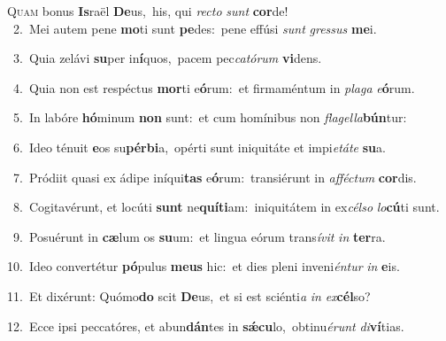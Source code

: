 \lettrine{\initial\textcolor{\initialcolor}{Q}}{uam} bonus \textbf{Is}\-raël \textbf{De}\-us,~\star his, qui \textit{rec}\-\textit{to} \textit{sunt} \textbf{cor}\-de!\\
{\numbfont\textcolor{\numbcolor}{~2.}}~Mei autem pene \textbf{mo}\-ti sunt \textbf{pe}\-des:~\star pene effúsi \textit{sunt} \textit{gres}\-\textit{sus} \textbf{me}\-i.\par
{\numbfont\textcolor{\numbcolor}{~3.}}~Quia zelávi \textbf{su}\-per in\-\textbf{í}\-quos,~\star pacem pec\-\textit{ca}\-\textit{tó}\textit{rum} \textbf{vi}\-dens.\par
{\numbfont\textcolor{\numbcolor}{~4.}}~Quia non est respéctus \textbf{mor}\-ti e\-\textbf{ó}\-rum:~\star et firmaméntum in \textit{pla}\-\textit{ga} \textit{e}\-\textbf{ó}rum.\par
{\numbfont\textcolor{\numbcolor}{~5.}}~In labóre \textbf{hó}\-minum \textbf{non} sunt:~\star et cum homínibus non \textit{fla}\-\textit{gel}\textit{la}\textbf{bún}tur:\par
{\numbfont\textcolor{\numbcolor}{~6.}}~Ideo ténuit \textbf{e}\-os su\-\textbf{pér}\-\textbf{bi}a,~\star opérti sunt iniquitáte et impi\-\textit{e}\-\textit{tá}\textit{te} \textbf{su}\-a.\par
{\numbfont\textcolor{\numbcolor}{~7.}}~Pródiit quasi ex ádipe iníqui\textbf{tas} e\-\textbf{ó}\-rum:~\star transiérunt in \textit{af}\-\textit{féc}\textit{tum} \textbf{cor}\-dis.\par
{\numbfont\textcolor{\numbcolor}{~8.}}~Cogitavérunt, et locúti \textbf{sunt} ne\-\textbf{quí}\-\textbf{ti}am:~\star iniquitátem in ex\-\textit{cél}\-\textit{so} \textit{lo}\-\textbf{cú}ti sunt.\par
{\numbfont\textcolor{\numbcolor}{~9.}}~Posuérunt in \textbf{cæ}\-lum os \textbf{su}\-um:~\star et lingua eórum trans\-\textit{í}\-\textit{vit} \textit{in} \textbf{ter}\-ra.\par
{\numbfont\textcolor{\numbcolor}{10.}}~Ideo convertétur \textbf{pó}\-pulus \textbf{me}\-\textbf{us} hic:~\star et dies pleni inveni\-\textit{én}\-\textit{tur} \textit{in} \textbf{e}\-is.\par
{\numbfont\textcolor{\numbcolor}{11.}}~Et dixérunt: Quómo\textbf{do} scit \textbf{De}\-us,~\star et si est sciénti\textit{a} \textit{in} \textit{ex}\-\textbf{cél}so?\par
{\numbfont\textcolor{\numbcolor}{12.}}~Ecce ipsi peccatóres, et abun\-\textbf{dán}\-tes in \textbf{sǽ}\-\textbf{cu}lo,~\star obtinu\-\textit{é}\-\textit{runt} \textit{di}\-\textbf{ví}tias.\par
